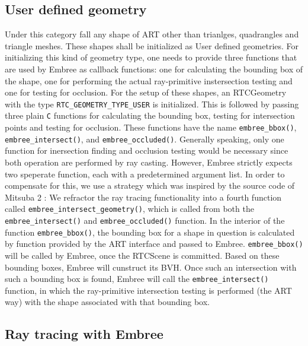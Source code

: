 \subsection{User defined geometry}
Under this category fall any shape of ART other than trianlges, quadrangles and triangle meshes. These shapes shall be initialized as User defined geometries. For initializing this kind of geometry type, one needs to provide three functions that are used by Embree as callback functions: one for calculating the bounding box of the shape, one for performing the actual ray-primitive instersection testing and one for testing for occlusion. For the setup of these shapes, an RTCGeometry with the type \texttt{RTC\_GEOMETRY\_TYPE\_USER} is initialized. This is followed by passing three plain \texttt{C} functions for calculating the bounding box, testing for intersection points and testing for occlusion. 
These functions have the name \texttt{embree\_bbox()}, \texttt{embree\_intersect()}, and \texttt{embree\_occluded()}. Generally speaking, only one function for inersection finding  and occlusion testing would be necessary since both operation are performed by ray casting. However, Embree strictly expects two speperate function, each with a predetermined argument list. In order to compensate for this, we use a strategy which was inspired by the source code of Mitsuba 2 \cite{nimier2019mitsuba}: We refractor the ray tracing functionality into a fourth function called \texttt{embree\_intersect\_geometry()}, which is called from both the \texttt{embree\_intersect()} and \texttt{embree\_occluded()} function. 
In the interior of the function \texttt{embree\_bbox()}, the bounding box for a shape in question is calculated by function provided by the ART interface  and passed to Embree. \texttt{embree\_bbox()} will be called by Embree, once the RTCScene is committed. Based on these bounding boxes, Embree will cunstruct its BVH. Once such an intersection with such a bounding box is found, Embree will call the \texttt{embree\_intersect()} function, in which the ray-primitive intersection testing is performed (the ART way) with the shape associated with that bounding box.



\subsection{Ray tracing with Embree}
\label{sec:embree_raycasting}


